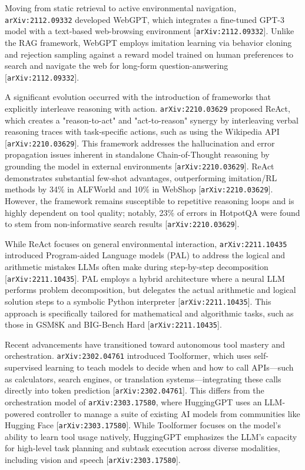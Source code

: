 \documentclass[11pt]{article}
\begin{document}
Moving from static retrieval to active environmental navigation, \texttt{arXiv:2112.09332} developed WebGPT, which integrates a fine-tuned GPT-3 model with a text-based web-browsing environment [\texttt{arXiv:2112.09332}]. Unlike the RAG framework, WebGPT employs imitation learning via behavior cloning and rejection sampling against a reward model trained on human preferences to search and navigate the web for long-form question-answering [\texttt{arXiv:2112.09332}].

A significant evolution occurred with the introduction of frameworks that explicitly interleave reasoning with action. \texttt{arXiv:2210.03629} proposed ReAct, which creates a "reason-to-act" and "act-to-reason" synergy by interleaving verbal reasoning traces with task-specific actions, such as using the Wikipedia API [\texttt{arXiv:2210.03629}]. This framework addresses the hallucination and error propagation issues inherent in standalone Chain-of-Thought reasoning by grounding the model in external environments [\texttt{arXiv:2210.03629}]. ReAct demonstrates substantial few-shot advantages, outperforming imitation/RL methods by 34\% in ALFWorld and 10\% in WebShop [\texttt{arXiv:2210.03629}]. However, the framework remains susceptible to repetitive reasoning loops and is highly dependent on tool quality; notably, 23\% of errors in HotpotQA were found to stem from non-informative search results [\texttt{arXiv:2210.03629}].

While ReAct focuses on general environmental interaction, \texttt{arXiv:2211.10435} introduced Program-aided Language models (PAL) to address the logical and arithmetic mistakes LLMs often make during step-by-step decomposition [\texttt{arXiv:2211.10435}]. PAL employs a hybrid architecture where a neural LLM performs problem decomposition, but delegates the actual arithmetic and logical solution steps to a symbolic Python interpreter [\texttt{arXiv:2211.10435}]. This approach is specifically tailored for mathematical and algorithmic tasks, such as those in GSM8K and BIG-Bench Hard [\texttt{arXiv:2211.10435}].

Recent advancements have transitioned toward autonomous tool mastery and orchestration. \texttt{arXiv:2302.04761} introduced Toolformer, which uses self-supervised learning to teach models to decide when and how to call APIs—such as calculators, search engines, or translation systems—integrating these calls directly into token prediction [\texttt{arXiv:2302.04761}]. This differs from the orchestration model of \texttt{arXiv:2303.17580}, where HuggingGPT uses an LLM-powered controller to manage a suite of existing AI models from communities like Hugging Face [\texttt{arXiv:2303.17580}]. While Toolformer focuses on the model's ability to learn tool usage natively, HuggingGPT emphasizes the LLM's capacity for high-level task planning and subtask execution across diverse modalities, including vision and speech [\texttt{arXiv:2303.17580}].
\end{document}
